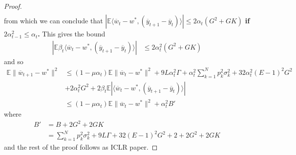 \begin{proof}
\begin{align*}
	\end{align*}
	from which we can conclude that $|\mathbb{E}\langle\overline{w}_{t}-w^{\ast},(\overline{y}_{t+1}-\overline{y}_{t})\rangle|\leq2\alpha_{t}(G^{2}+GK)$\textbf{
		if $2\alpha_{t-1}^{2}\leq\alpha_{t}$.} This gives the bound
	\begin{align*}
	|\mathbb{E}\beta_{t}\langle\overline{w}_{t}-w^{\ast},(\overline{y}_{t+1}-\overline{y}_{t})\rangle| & \leq2\alpha_{t}^{2}(G^{2}+GK)
	\end{align*}
	and so
	\begin{align*}
	\mathbb{E}\|\overline{w}_{t+1}-w^{\ast}\|^{2} & \leq(1-\mu\alpha_{t})\mathbb{E}\|\overline{w}_{t}-w^{\ast}\|^{2}+9L\alpha_{t}^{2}\Gamma+\alpha_{t}^{2}\sum_{k=1}^{N}p_{k}^{2}\sigma_{k}^{2}+32\alpha_{t}^{2}(E-1)^{2}G^{2}\\
	& +2\alpha_{t}^{2}G^{2}+2\beta_{t}\mathbb{E}|\langle\overline{w}_{t}-w^{\ast},(\overline{y}_{t+1}-\overline{y}_{t})\rangle|\\
	& \leq(1-\mu\alpha_{t})\mathbb{E}\|\overline{w}_{t}-w^{\ast}\|^{2}+\alpha_{t}^{2}B'
	\end{align*}
	where 
	\begin{align*}
	B' & =B+2G^{2}+2GK\\
	& =\sum_{k=1}^{N}p_{k}^{2}\sigma_{k}^{2}+9L\Gamma+32(E-1)^{2}G^{2}+2+2G^{2}+2GK
	\end{align*}
	and the rest of the proof follows as ICLR paper. 
\end{proof}

